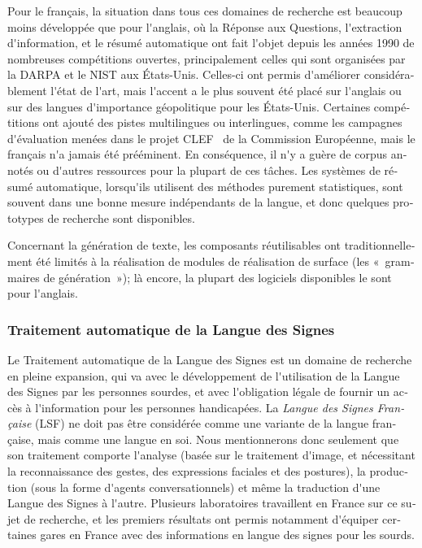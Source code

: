 \begin{french}
\begin{multicols}{2}
Pour le français, la situation dans tous ces domaines de recherche est
beaucoup moins développée que pour l{\mbox '}anglais, où la Réponse aux
Questions, l{\mbox '}extraction d{\mbox '}information, et le résumé automatique ont
fait l{\mbox '}objet depuis les années 1990 de nombreuses compétitions
ouvertes, principalement celles qui sont organisées par la DARPA et le
NIST aux États-Unis. Celles-ci ont permis d{\mbox '}améliorer considérablement
l{\mbox '}état de l{\mbox '}art, mais l{\mbox '}accent a le plus souvent été placé sur
l{\mbox '}anglais ou sur des langues d{\mbox '}importance géopolitique pour les
États-Unis. Certaines compétitions ont ajouté des pistes multilingues
ou interlingues, comme les campagnes d{\mbox '}évaluation menées dans le
projet CLEF~\cite{clef} de la Commission Européenne, mais le français n{\mbox '}a jamais
été prééminent. En conséquence, il n{\mbox '}y a guère de corpus annotés ou
d{\mbox '}autres ressources pour la plupart de ces tâches. Les systèmes de
résumé automatique, lorsqu{\mbox '}ils utilisent des méthodes purement
statistiques, sont souvent dans une bonne mesure indépendants de la
langue, et donc quelques prototypes de recherche sont
disponibles. 

Concernant la génération de texte, les composants réutilisables ont
traditionnellement été limités à la réalisation de modules de
réalisation de surface (les «~grammaires de génération~»); là encore,
la plupart des logiciels disponibles le sont pour l{\mbox '}anglais.

\subsubsection{Traitement automatique de la Langue des Signes}

Le Traitement automatique de la Langue des Signes est un domaine de
recherche en pleine expansion, qui va avec le développement de
l{\mbox '}utilisation de la Langue des Signes par les personnes sourdes, et
avec l{\mbox '}obligation légale de fournir un accès à l{\mbox '}information pour les
personnes handicapées. La {\em Langue des Signes Française} (LSF) ne
doit pas être considérée comme une variante de la langue française,
mais comme une langue en soi. Nous mentionnerons donc seulement que
son traitement comporte l{\mbox '}analyse (basée sur le traitement d{\mbox '}image, et
nécessitant la reconnaissance des gestes, des expressions faciales et
des postures), la production (sous la forme d{\mbox '}agents conversationnels)
et même la traduction d{\mbox '}une Langue des Signes à l{\mbox '}autre. Plusieurs
laboratoires travaillent en France sur ce sujet de recherche, et les
premiers résultats ont permis notamment d{\mbox '}équiper certaines gares en France avec
des informations en langue des signes pour les sourds.


\end{multicols}
\end{french}
